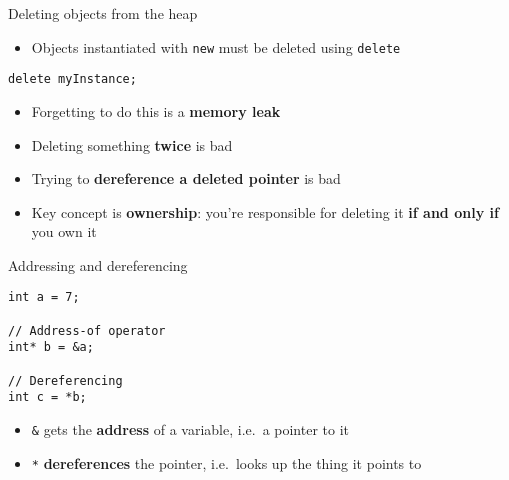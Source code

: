 \begin{frame}[fragile]{Deleting objects from the heap}
    \begin{itemize}
        \item Objects instantiated with \lstinline{new} must be deleted using \lstinline{delete} \pause
    \end{itemize}
    \begin{lstlisting}
delete myInstance;
    \end{lstlisting}
    \pause
    \begin{itemize}
        \item Forgetting to do this is a \textbf{memory leak} \pause
        \item Deleting something \textbf{twice} is bad \pause
        \item Trying to \textbf{dereference a deleted pointer} is bad
				\pause\item Key concept is \textbf{ownership}: you're responsible for deleting it \textbf{if and only if} you own it
    \end{itemize}
\end{frame}

\begin{frame}[fragile]{Addressing and dereferencing}
    \begin{lstlisting}
int a = 7;

// Address-of operator
int* b = &a;

// Dereferencing
int c = *b;
    \end{lstlisting}
    \pause
    \begin{itemize}
        \item \lstinline{&} gets the \textbf{address} of a variable, i.e.\ a pointer to it
        \item \lstinline{*} \textbf{dereferences} the pointer, i.e.\ looks up the thing it points to
    \end{itemize}
\end{frame}

